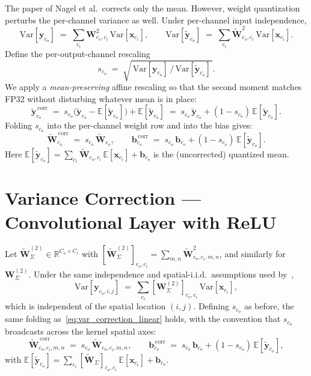 \documentclass[11pt,a4paper]{article}
\newcommand{\W}{\mathbf{W}}
\newcommand{\Wt}{\widetilde{\mathbf{W}}}
\newcommand{\xx}{\mathbf{x}}
\newcommand{\y}{\mathbf{y}}
\newcommand{\yt}{\widetilde{\mathbf{y}}}
\newcommand{\E}{\mathbb{E}}
\newcommand{\Var}{\mathrm{Var}}
\begin{document}
The paper of Nagel et al.\ corrects only the mean. However, weight quantization perturbs the per-channel variance as well. Under per-channel input independence,
\begin{equation}
\Var[\y_{c_o}] \;=\; \sum_{c_i}\W_{c_o,c_i}^2\,\Var[\xx_{c_i}], \qquad
\Var[\yt_{c_o}] \;=\; \sum_{c_i}\Wt_{c_o,c_i}^2\,\Var[\xx_{c_i}].
\end{equation}
Define the per-output-channel rescaling
\begin{equation}
s_{c_o} \;=\; \sqrt{\,\Var[\y_{c_o}]\,/\,\Var[\yt_{c_o}]\,}.
\end{equation}
We apply a \emph{mean-preserving} affine rescaling so that the second moment matches FP32 without disturbing whatever mean is in place:
\begin{equation}
\yt_{c_o}^{\,\mathrm{corr}} \;=\; s_{c_o}\bigl(\yt_{c_o} - \E[\yt_{c_o}]\bigr) + \E[\yt_{c_o}]
\;=\; s_{c_o}\,\yt_{c_o} + (1-s_{c_o})\,\E[\yt_{c_o}].
\label{eq:var_correction_form}
\end{equation}
Folding $s_{c_o}$ into the per-channel weight row and into the bias gives:
\begin{equation}
\boxed{\;\Wt^{\,\mathrm{corr}}_{c_o} \;=\; s_{c_o}\,\Wt_{c_o}, \qquad
\mathbf{b}^{\,\mathrm{corr}}_{c_o} \;=\; s_{c_o}\,\mathbf{b}_{c_o} + (1-s_{c_o})\,\E[\yt_{c_o}].\;}
\label{eq:var_correction_linear}
\end{equation}
Here $\E[\yt_{c_o}] = \sum_{c_i}\Wt_{c_o,c_i}\,\E[\xx_{c_i}] + \mathbf{b}_{c_o}$ is the (uncorrected) quantized mean.

\section{Variance Correction --- Convolutional Layer with ReLU}

Let $\Wt^{(2)}_\Sigma \in \mathbb{R}^{C_o\times C_i}$ with $[\Wt^{(2)}_\Sigma]_{c_o,c_i} = \sum_{m,n}\Wt_{c_o,c_i,m,n}^2$, and similarly for $\W^{(2)}_\Sigma$. Under the same independence and spatial-i.i.d.\ assumptions used by~\cite[App.~B]{nagel2019},
\begin{equation}
\Var[\y_{c_o,i,j}] \;=\; \sum_{c_i}[\W^{(2)}_\Sigma]_{c_o,c_i}\,\Var[\xx_{c_i}],
\end{equation}
which is independent of the spatial location $(i,j)$. Defining $s_{c_o}$ as before, the same folding as~\eqref{eq:var_correction_linear} holds, with the convention that $s_{c_o}$ broadcasts across the kernel spatial axes:
\begin{equation}
\boxed{\;\Wt^{\,\mathrm{corr}}_{c_o,c_i,m,n} \;=\; s_{c_o}\,\Wt_{c_o,c_i,m,n}, \qquad
\mathbf{b}^{\,\mathrm{corr}}_{c_o} \;=\; s_{c_o}\,\mathbf{b}_{c_o} + (1-s_{c_o})\,\E[\yt_{c_o}],\;}
\end{equation}
with $\E[\yt_{c_o}] = \sum_{c_i}[\Wt_\Sigma]_{c_o,c_i}\,\E[\xx_{c_i}] + \mathbf{b}_{c_o}$.
\end{document}
